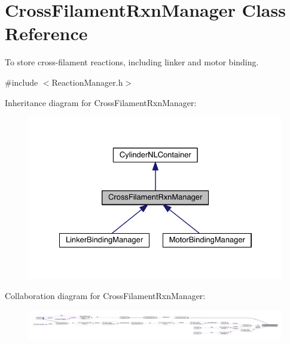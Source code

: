 \hypertarget{classCrossFilamentRxnManager}{\section{Cross\+Filament\+Rxn\+Manager Class Reference}
\label{classCrossFilamentRxnManager}
}


To store cross-\/filament reactions, including linker and motor binding.  




{\ttfamily \#include $<$Reaction\+Manager.\+h$>$}



Inheritance diagram for Cross\+Filament\+Rxn\+Manager\+:\nopagebreak
\begin{figure}[H]
\begin{center}
\leavevmode
\includegraphics[width=328pt]{classCrossFilamentRxnManager__inherit__graph}
\end{center}
\end{figure}


Collaboration diagram for Cross\+Filament\+Rxn\+Manager\+:\nopagebreak
\begin{figure}[H]
\begin{center}
\leavevmode
\includegraphics[width=350pt]{classCrossFilamentRxnManager__coll__graph}
\end{center}
\end{figure}
